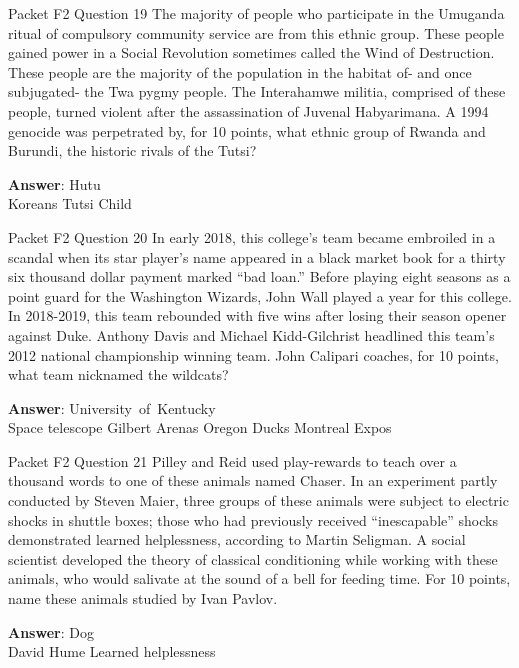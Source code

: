 \begin{frame}{Packet F2 Question 19}
The majority of people who participate in the Umuganda ritual of compulsory community service are from this ethnic group. These people gained power in a Social Revolution sometimes called the Wind of Destruction. These people are the majority of the population in the habitat of- and once subjugated- the   Twa pygmy people. The Interahamwe militia, comprised of these people, turned violent after the assassination of Juvenal Habyarimana. A 1994   genocide was perpetrated by, for 10 points, what ethnic group of Rwanda and Burundi,   the historic rivals of the Tutsi?    

\textbf{Answer}: Hutu\\
 Koreans
 Tutsi
 Child
\end{frame}

\begin{frame}{Packet F2 Question 20}
In early 2018, this college’s   team became embroiled in a scandal when its star player’s name appeared in a black market book for a thirty six thousand dollar payment marked “bad loan.” Before playing eight seasons as a point guard for the Washington Wizards, John   Wall played a year for this college. In 2018-2019, this team rebounded with five wins after losing their season opener against Duke. Anthony Davis and Michael Kidd-Gilchrist headlined this team’s 2012 national championship winning team. John Calipari coaches, for 10 points, what team nicknamed the wildcats?    

\textbf{Answer}: University\ of\ Kentucky\\
 Space telescope
 Gilbert Arenas
 Oregon Ducks
 Montreal Expos
\end{frame}

\begin{frame}{Packet F2 Question 21}
Pilley and Reid used play-rewards to teach over a thousand words to one of these animals   named Chaser.     In an experiment partly conducted by Steven Maier, three groups of these animals were subject to electric shocks in shuttle boxes; those who had previously received “inescapable” shocks demonstrated   learned helplessness, according to Martin Seligman. A social scientist developed the theory of classical conditioning while working with these animals, who would salivate at the sound   of a bell for feeding time. For 10 points, name these animals studied by Ivan Pavlov.

\textbf{Answer}: Dog\\
 David Hume
 Learned helplessness
\end{frame}

